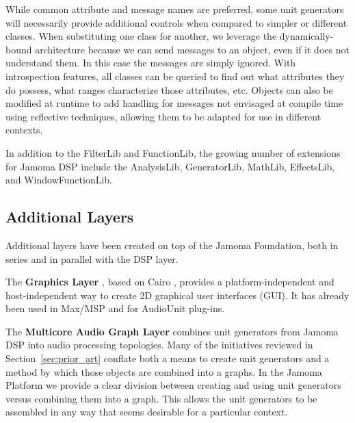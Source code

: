 \documentclass[twoside,10pt]{article}
\begin{document}
While common attribute and message names are preferred, some unit generators will necessarily provide additional controls when compared to simpler or different classes.  When substituting one class for another, we leverage the dynamically-bound architecture because we can send messages to an object, even if it does not understand them.  In this case the messages are simply ignored.  With introspection features, all classes can be queried to find out what attributes they do possess, what ranges characterize those attributes, etc.  Objects can also be modified at runtime to add handling for messages not envisaged at compile time using reflective techniques, allowing them to be adapted for use in different contexts.

In addition to the FilterLib and FunctionLib, the growing number of extensions for Jamoma DSP include the AnalysisLib, GeneratorLib, MathLib, EffectsLib, and WindowFunctionLib.




\subsection{Additional Layers} %

Additional layers have been created on top of the Jamoma Foundation, both in series and in parallel with the DSP layer.  

The \textbf{Graphics Layer} \cite{web10}, based on Cairo \cite{web11}, provides a platform-independent and host-independent way to create 2D graphical user interfaces (GUI). It has already been used in Max/MSP and for AudioUnit plug-ins.

The \textbf{Multicore Audio Graph Layer} \cite{web12} combines unit generators from Jamoma DSP into audio processing topologies.  Many of the initiatives reviewed in Section~\ref{sec:prior_art} conflate both a means to create unit generators and a method by which those objects are combined into a graphs.  In the Jamoma Platform we provide a clear division between creating and using unit generators versus combining them into a graph.  This allows the unit generators to be assembled in any way that seems desirable for a particular context.
\end{document}
